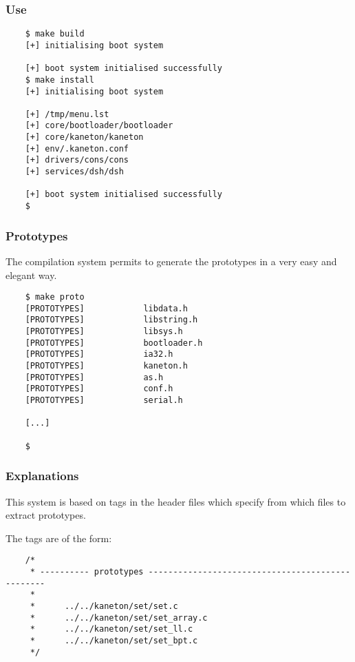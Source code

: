 
\begin{frame}[containsverbatim]
  \frametitle{Use}

  \begin{verbatim}
    $ make build
    [+] initialising boot system

    [+] boot system initialised successfully
    $ make install
    [+] initialising boot system

    [+] /tmp/menu.lst
    [+] core/bootloader/bootloader
    [+] core/kaneton/kaneton
    [+] env/.kaneton.conf
    [+] drivers/cons/cons
    [+] services/dsh/dsh

    [+] boot system initialised successfully
    $
  \end{verbatim}
\end{frame}


\begin{frame}[containsverbatim]
  \frametitle{Prototypes}

  The compilation system permits to generate the prototypes in a very easy
  and elegant way.

  \begin{verbatim}
    $ make proto
    [PROTOTYPES]            libdata.h
    [PROTOTYPES]            libstring.h
    [PROTOTYPES]            libsys.h
    [PROTOTYPES]            bootloader.h
    [PROTOTYPES]            ia32.h
    [PROTOTYPES]            kaneton.h
    [PROTOTYPES]            as.h
    [PROTOTYPES]            conf.h
    [PROTOTYPES]            serial.h

    [...]

    $
  \end{verbatim}
\end{frame}


\begin{frame}[containsverbatim]
  \frametitle{Explanations}

  This system is based on tags in the header files which specify
  from which files to extract prototypes.

  \nl

  The tags are of the form:

  \begin{verbatim}
    /*
     * ---------- prototypes -------------------------------------------------
     *
     *      ../../kaneton/set/set.c
     *      ../../kaneton/set/set_array.c
     *      ../../kaneton/set/set_ll.c
     *      ../../kaneton/set/set_bpt.c
     */
  \end{verbatim}
\end{frame}

